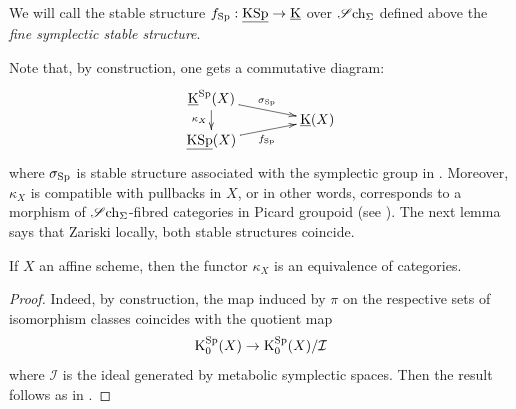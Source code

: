 \begin{df}\label{df:fine-sp-structure}
We will call the stable structure $f_{\mathrm{Sp}}:\operatorname{\underline{KSp}} \rightarrow \operatorname{\underline K}$ over $\operatorname{\mathscr Sch_\Sigma}$ defined above
 the \emph{fine symplectic stable structure}.
\end{df}

\begin{num}
Note that, by construction, one gets a commutative diagram:
$$
\xymatrix@R=-2pt@C=40pt{
\uK^{\Sp}(X)\ar^{\sigma_\Sp}[rd]\ar_{\kappa_X}[dd] & \\
& \uK(X) \\
\uKSp(X)\ar_{f_\Sp}[ru]
}
$$
where $\sigma_{\mathrm{Sp}}$ is stable structure associated with
 the symplectic group in .
 Moreover, $\kappa_X$ is compatible with pullbacks in $X$, or in other words,
 corresponds to a morphism of $\operatorname{\mathscr Sch_\Sigma}$-fibred categories in Picard groupoid
 (see ).
 The next lemma says that Zariski locally, both stable structures coincide.
\end{num}
\begin{lm}
If $X$ an affine scheme, then the functor $\kappa_X$ is an equivalence of categories.
\end{lm}
\begin{proof}
Indeed, by construction, the map induced by $\pi$ on the respective sets of isomorphism classes coincides
 with the quotient map
$$
\mathrm K^{\mathrm{Sp}}_0(X) \rightarrow \mathrm K^{\mathrm{Sp}}_0(X)/\mathcal I
$$
where $\mathcal I$ is the ideal generated by metabolic symplectic spaces.
 Then the result follows as in \cite[, Prop. 1]{Kneb}.
\end{proof}

